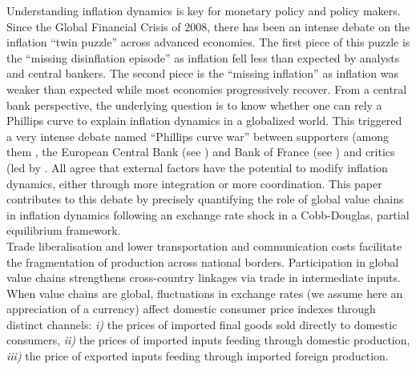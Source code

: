 \documentclass[11pt,a4paper]{article}
\begin{document}

Understanding inflation dynamics is key for monetary policy and policy makers.
Since the Global Financial Crisis of 2008, there has been an intense debate on the inflation “twin puzzle” across advanced economies.
The first piece of this puzzle is the “missing disinflation episode” as inflation fell less than expected by analysts and central bankers.
The second piece is the “missing inflation” as inflation was weaker than expected while most economies progressively recover.  From a central bank perspective, the underlying question is to know whether one can rely a Phillips curve to explain inflation dynamics in a globalized world.
This triggered a very intense debate named “Phillips curve war” between supporters (among them \cite{Blanchard2016}, the European Central Bank (see \cite{Eser2020}) and Bank of France (see \cite{Berson2018}) and critics (led by \cite{Farmer2018}.
All agree that external factors have the potential to modify inflation dynamics, either through more integration or more coordination.
This paper contributes to this debate by precisely quantifying the role of global value chains in inflation dynamics following an exchange rate shock in a Cobb-Douglas, partial equilibrium framework.
\\
Trade liberalisation and lower transportation and communication costs facilitate the fragmentation of production across national borders.
Participation in global value chains strengthens cross-country linkages via trade in intermediate inputs.
When value chains are global, fluctuations in exchange rates (we assume here an appreciation of a currency) aﬀect domestic consumer price indexes through distinct channels: \textit{i)} the prices of imported ﬁnal goods sold directly to domestic consumers,
\textit{ii)} the prices of imported inputs feeding through domestic production,
\textit{iii)} the price of exported inputs feeding through imported foreign production.
\end{document}
